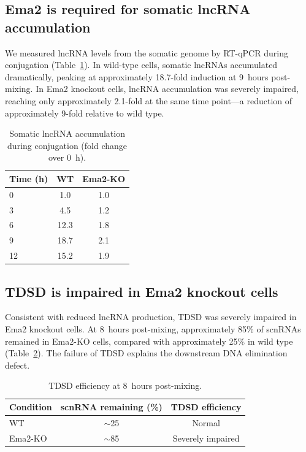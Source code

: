 \documentclass[11pt]{article}
\begin{document}
\subsection{Ema2 is required for somatic lncRNA accumulation}

We measured lncRNA levels from the somatic genome by RT-qPCR during conjugation (Table~\ref{tab:lncrna}). In wild-type cells, somatic lncRNAs accumulated dramatically, peaking at approximately 18.7-fold induction at 9~hours post-mixing. In Ema2 knockout cells, lncRNA accumulation was severely impaired, reaching only approximately 2.1-fold at the same time point---a reduction of approximately 9-fold relative to wild type.

\begin{table}[ht]
\centering
\caption{Somatic lncRNA accumulation during conjugation (fold change over 0~h).}
\label{tab:lncrna}
\begin{tabular}{lcc}
\toprule
\textbf{Time (h)} & \textbf{WT} & \textbf{Ema2-KO} \\
\midrule
0 & 1.0 & 1.0 \\
3 & 4.5 & 1.2 \\
6 & 12.3 & 1.8 \\
9 & 18.7 & 2.1 \\
12 & 15.2 & 1.9 \\
\bottomrule
\end{tabular}
\end{table}

\subsection{TDSD is impaired in Ema2 knockout cells}

Consistent with reduced lncRNA production, TDSD was severely impaired in Ema2 knockout cells. At 8~hours post-mixing, approximately 85\% of scnRNAs remained in Ema2-KO cells, compared with approximately 25\% in wild type (Table~\ref{tab:tdsd}). The failure of TDSD explains the downstream DNA elimination defect.

\begin{table}[ht]
\centering
\caption{TDSD efficiency at 8~hours post-mixing.}
\label{tab:tdsd}
\begin{tabular}{lcc}
\toprule
\textbf{Condition} & \textbf{scnRNA remaining (\%)} & \textbf{TDSD efficiency} \\
\midrule
WT & $\sim$25 & Normal \\
Ema2-KO & $\sim$85 & Severely impaired \\
\bottomrule
\end{tabular}
\end{table}
\end{document}

